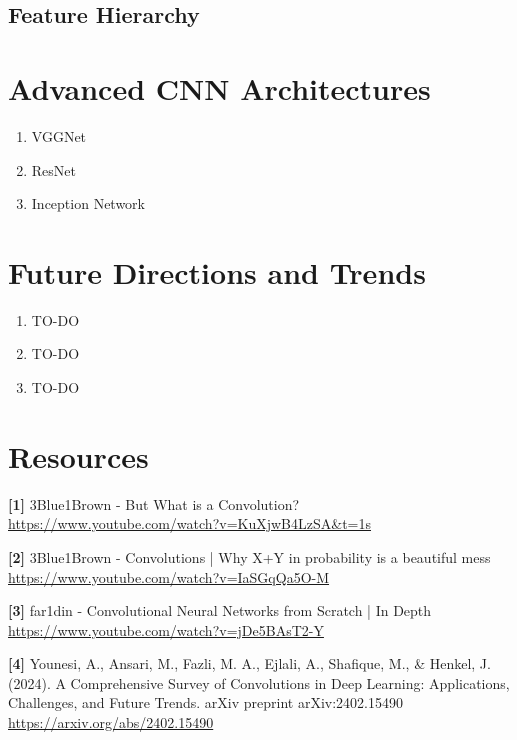 \documentclass{article}
\begin{document}
    \subsection{Feature Hierarchy}
    
\section{Advanced CNN Architectures}
    \begin{enumerate}[label=(\alph*)]
        \item VGGNet
        \item ResNet
        \item Inception Network
    \end{enumerate}
    
\section{Future Directions and Trends}
    \begin{enumerate}[label=(\alph*)]
        \item TO-DO
        \item TO-DO
        \item TO-DO
    \end{enumerate}

\section{Resources}
    \textbf{[1]} 3Blue1Brown - But What is a Convolution? \\
    \url{https://www.youtube.com/watch?v=KuXjwB4LzSA&t=1s}
    
    \textbf{[2]} 3Blue1Brown - Convolutions | Why X+Y in probability is a beautiful mess \\
    \url{https://www.youtube.com/watch?v=IaSGqQa5O-M}
    
    \textbf{[3]} far1din - Convolutional Neural Networks from Scratch | In Depth \\
    \url{https://www.youtube.com/watch?v=jDe5BAsT2-Y}
    
    \textbf{[4]} Younesi, A., Ansari, M., Fazli, M. A., Ejlali, A., Shafique, M., \& Henkel, J. (2024). A Comprehensive Survey of Convolutions in Deep Learning: Applications, Challenges, and Future Trends. arXiv preprint arXiv:2402.15490 \\
    \url{https://arxiv.org/abs/2402.15490}
\end{document}
